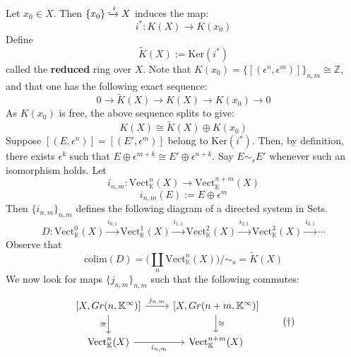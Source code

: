 \documentclass[11pt,a4paper]{article}
\begin{document}
Let $x_0\in X$. Then $\{x_0\} \xhookrightarrow{i} X$ induces the map:
$$i^*: K(X) \rightarrow K(x_0)$$
Define
$$\widetilde{K}(X) := \text{Ker}(i^*)$$
called the \textbf{reduced} ring over $X$. Note that $K(x_0) = \{[(\epsilon^n, \epsilon^m)]\}_{n, m} \cong \mathbb{Z}$, and that one has the following exact sequence:
$$0\rightarrow \widetilde{K}(X) \rightarrow K(X) \rightarrow K(x_0) \rightarrow 0$$
As $K(x_0)$ is free, the above sequence splits to give:
$$K(X)\cong \widetilde{K}(X)\oplus K(x_0)$$
Suppose $[(E, \epsilon^n)] = [(E', \epsilon^m)]$ belong to $\text{Ker}(i^*)$. Then, by definition, there exists $\epsilon^k$ such that $E\oplus \epsilon^{m+k} \cong E'\oplus \epsilon^{n+k}$. Say $E\sim_s E'$ whenever such an isomorphism holds. Let
$$i_{n, m}: \text{Vect}_{\mathbb{K}}^n(X) \rightarrow \text{Vect}_{\mathbb{K}}^{n+m}(X)$$
$$i_{n, m}(E):= E\oplus \epsilon^m$$
Then $\{i_{n, m}\}_{n, m}$ defines the following diagram of a directed system in Sets.
$$D:   \text{Vect}_{\mathbb{K}}^0(X) \xrightarrow{i_{0,1}} \text{Vect}_{\mathbb{K}}^1(X) \xrightarrow{i_{1,1}} \text{Vect}_{\mathbb{K}}^2(X) \xrightarrow{i_{2,1}} \text{Vect}_{\mathbb{K}}^3(X) \xrightarrow{i_{3,1}} \cdots$$
Observe that
$$\text{colim}(D) = \bigg(\coprod\limits_{n}\text{Vect}_{\mathbb{K}}^n(X)\bigg)\bigg/\sim_s  = \widetilde{K}(X)$$
We now look for maps $\{j_{n,m}\}_{n,m}$ such that the following commutes:
\begin{equation*}
    \begin{tikzcd}
	{[X, Gr(n, \mathbb{K}^{\infty})]} & {[X, Gr(n+m, \mathbb{K}^{\infty})]} \\
	{\text{Vect}_{\mathbb{K}}^n(X)} & {\text{Vect}_{\mathbb{K}}^{n+m}(X)}
	\arrow["\cong"', from=1-1, to=2-1]
	\arrow["\cong", from=1-2, to=2-2]
	\arrow["{i_{n, m}}"', from=2-1, to=2-2]
	\arrow["{j_{n, m}}", from=1-1, to=1-2]
    \end{tikzcd} \tag{†}
\end{equation*}
\end{document}
